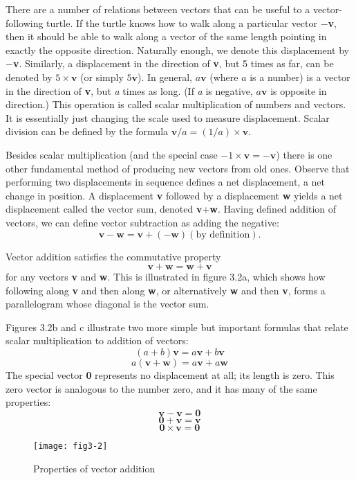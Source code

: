 \documentclass{book}
\begin{document}
There are a number of relations between vectors that can be useful
to a vector-following turtle. If the turtle knows how to walk along a
particular vector $-$\textbf{v}, then it should be able to walk along a vector of
the same length pointing in exactly the opposite direction. Naturally
enough, we denote this displacement by $-$\textbf{v}. Similarly, a displacement
in the direction of \textbf{v}, but 5 times as far, can be denoted by $5 \times \textbf{v}$ (or simply
$5\textbf{v}$). In general, $a\textbf{v}$ (where $a$ is a number) is a vector in the direction of \textbf{v},
but {\em a} times as long. (If {\em a} is negative, $a\textbf{v}$ is opposite in direction.) This
operation is called scalar multiplication of numbers and vectors. It is
essentially just changing the scale used to measure displacement. Scalar
division can be defined by the formula $\textbf{v}/a = (1 / a) \times \mathbf{v}$.

Besides scalar multiplication (and the special case $-1 \times \textbf{v} = -\textbf{v}$)
there is one other fundamental method of producing new vectors from
old ones. Observe that performing two displacements in sequence defines
a net displacement, a net change in position. A displacement \textbf{v} followed
by a displacement \textbf{w} yields a net displacement called the vector sum,
denoted \textbf{v}+\textbf{w}. Having defined addition of vectors, we can define vector
subtraction as adding the negative:
$$\textbf{v} - \textbf{w} = \textbf{v} + (-\textbf{w}) (\text{by definition}).$$

Vector addition satisfies the commutative property
$$\textbf{v} + \textbf{w} = \textbf{w} + \textbf{v}$$
\noindent for any vectors \textbf{v} and \textbf{w}. This is illustrated in figure 3.2a, which shows
how following along \textbf{v} and then along \textbf{w}, or alternatively \textbf{w} and then \textbf{v},
forms a parallelogram whose diagonal is the vector sum.

Figures 3.2b and c illustrate two more simple but important formulas
that relate scalar multiplication to addition of vectors:
$$(a+b)\textbf{v}=a\textbf{v}+b\textbf{v}$$
$$a(\textbf{v} + \textbf{w}) = a\textbf{v} + a\textbf{w}$$
\noindent The special vector \textbf{0} represents no displacement at all; its length is
zero. This zero vector is analogous to the number zero, and it has many
of the same properties:
$$\textbf{v} - \textbf{v} = \textbf{0}$$
$$\textbf{0} + \textbf{v} = \textbf{v}$$
$$\textbf{0} \times \textbf{v} = \textbf{0}$$
\begin{figure}
\begin{center}
\texttt{[image: fig3-2]}
\caption{Properties of vector addition}
\end{center}
\end{figure}
\end{document}
